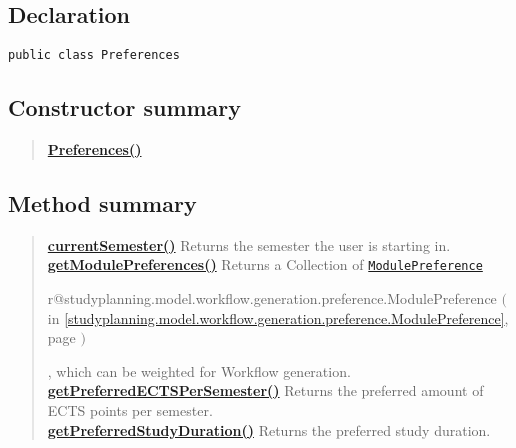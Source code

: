 \documentclass[11pt,a4paper]{report}
\makeatletter
\newcommand{\refdefined}[1]{
\expandafter\ifx\csname r@#1\endcsname\relax
\relax\else
{$($in \ref{#1}, page \pageref{#1}$)$}\fi}
\makeatother
\begin{document}
{{{{{{{{{{{{{			\subsection{Declaration}{
				\begin{lstlisting}[frame=none]
public class Preferences
				\end{lstlisting}
			}
			
			\subsection{Constructor summary}{
				\begin{verse}
					\hyperlink{studyplanning.model.workflow.generation.Preferences()}{{\bf Preferences()}} \\
				\end{verse}
			}
			
			\subsection{Method summary}{
				\begin{verse}
					\hyperlink{studyplanning.model.workflow.generation.Preferences.currentSemester()}{{\bf currentSemester()}} Returns the semester the user is starting in.\\
					\hyperlink{studyplanning.model.workflow.generation.Preferences.getModulePreferences()}{{\bf getModulePreferences()}} Returns a Collection of \texttt{\small \hyperlink{studyplanning.model.workflow.generation.preference.ModulePreference}{ModulePreference}}{\small 
					\refdefined{studyplanning.model.workflow.generation.preference.ModulePreference}}, which can be weighted for Workflow generation.\\
					\hyperlink{studyplanning.model.workflow.generation.Preferences.getPreferredECTSPerSemester()}{{\bf getPreferredECTSPerSemester()}} Returns the preferred amount of ECTS points per semester.\\
					\hyperlink{studyplanning.model.workflow.generation.Preferences.getPreferredStudyDuration()}{{\bf getPreferredStudyDuration()}} Returns the preferred study duration.\\
				\end{verse}
			}
			
}}}}}}}}}}}}}
\end{document}
